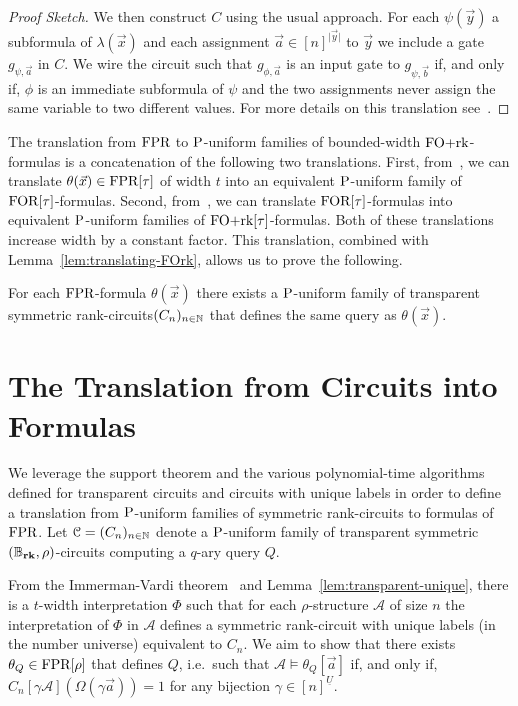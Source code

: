 \documentclass[a4paper,UKenglish]{lipics-v2018}
\begin{document}
\begin{proof}[Proof Sketch]
  We then construct $C$ using the usual approach. For each $\psi(\vec{y})$ a
  subformula of $\lambda(\vec{x})$ and each assignment $\vec{a} \in [n]^{\vert
    \vec{y} \vert}$ to $\vec{y}$ we include a gate $g_{\psi, \vec{a}}$ in $C$.
  We wire the circuit such that $g_{\phi, \vec{a}}$ is an input gate to
  $g_{\psi, \vec{b}}$ if, and only if, $\phi$ is an immediate subformula of
  $\psi$ and the two assignments never assign the same variable to two different
  values. For more details on this translation see~\cite{DW-arxiv}.
\end{proof}

The translation from $\text{\upshape FPR}$ to $\mathrm{P}$-uniform families of bounded-width
$\text{\upshape FO+rk}$-formulas is a concatenation of the following two translations. First,
from~\cite{Dawar09logicswith}, we can translate $\theta(\vec{x}) \in \text{\upshape FPR}[\tau]$
of width $t$ into an equivalent $\mathrm{P}$-uniform family of $\text{\upshape FOR}[\tau]$-formulas.
Second, from~\cite{libkin2004elements}, we can translate $\text{\upshape FOR}[\tau]$-formulas
into equivalent $\mathrm{P}$-uniform families of $\text{\upshape FO+rk}[\tau]$-formulas. Both of these
translations increase width by a constant factor. This translation, combined
with Lemma~\ref{lem:translating-FOrk}, allows us to prove the following.

\begin{theorem}
  For each $\text{\upshape FPR}$-formula $\theta(\vec{x})$ there exists a $\mathrm{P}$-uniform family
  of transparent symmetric rank-circuits$(C_n)_{n \in \mathbb{N}}$ that defines the
  same query as $\theta(\vec{x})$.
  \label{thm:translating-formulas-to-circuits}
\end{theorem}

\section{The Translation from Circuits into
  Formulas}\label{sec:circuits-to-formulas}
We leverage the support theorem and the various polynomial-time algorithms
defined for transparent circuits and circuits with unique labels in order to
define a translation from $\mathrm{P}$-uniform families of symmetric rank-circuits to
formulas of $\text{\upshape FPR}$. Let $\mathcal{C} = (C_n)_{n \in \mathbb{N}}$ denote a
$\mathrm{P}$-uniform family of transparent symmetric $(\mathbb{B}_{\text{\textbf{rk}}}, \rho)$-circuits computing a
$q$-ary query $Q$.

From the Immerman-Vardi theorem~\cite{Immerman198686, Vardi:1982} and
Lemma~\ref{lem:transparent-unique}, there is a $t$-width interpretation $\Phi$
such that for each $\rho$-structure $\mathcal{A}$ of size $n$ the interpretation
of $\Phi$ in $\mathcal{A}$ defines a symmetric rank-circuit with unique labels
(in the number universe) equivalent to $C_n$. We aim to show that there exists
$\theta_Q \in \text{\upshape FPR}[\rho]$ that defines $Q$, i.e.\ such that $\mathcal{A} \models
\theta_Q[\vec{a}]$ if, and only if, $C_n[\gamma \mathcal{A}](\Omega (\gamma
\vec{a})) = 1$ for any bijection $\gamma \in [n]^{\underline{U}}$.
\end{document}
